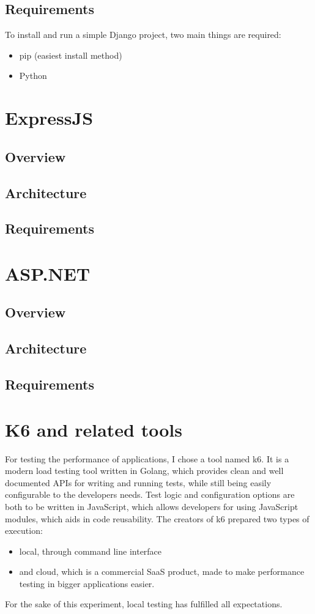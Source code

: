 \subsection{Requirements}
To install and run a simple Django project, two main things are required:
\begin{itemize}
    \item pip (easiest install method)
    \item Python
\end{itemize}


\section{ExpressJS}

\subsection{Overview}
\subsection{Architecture}
\subsection{Requirements}


\section{ASP.NET}

\subsection{Overview}
\subsection{Architecture}
\subsection{Requirements}

\section{K6 and related tools}

For testing the performance of applications, I chose a tool named k6. It is a modern load testing tool written in Golang, which provides clean and well documented APIs for writing and running tests, while still being easily configurable to the developers needs. Test logic and configuration options are both to be written in JavaScript, which allows developers for using JavaScript modules, which aids in code reusability. The creators of k6 prepared two types of execution:
\begin{itemize}
    \item local, through command line interface
    \item and cloud, which is a commercial SaaS product, made to make performance testing in bigger applications easier.
\end{itemize}
For the sake of this experiment, local testing has fulfilled all expectations.

